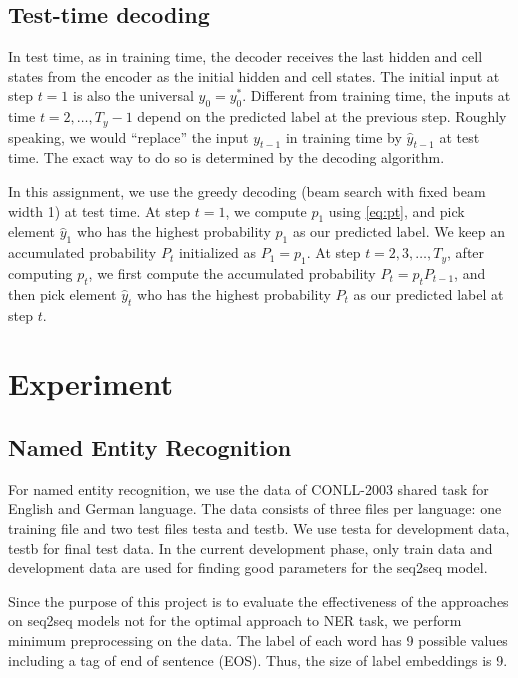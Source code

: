 \documentclass[11pt,a4paper]{article}
\begin{document}
\subsection{Test-time decoding}

In test time, as in training time, the decoder receives the last hidden and cell states from the encoder as the initial hidden and cell states. The initial input at step $t = 1$ is also the universal $y_0 = y_0^*$. Different from training time, the inputs at time $t = 2, \dots, T_y - 1$ depend on the predicted label at the previous step. Roughly speaking, we would ``replace'' the input $y_{t-1}$ in training time by $\hat{y}_{t-1}$ at test time. The exact way to do so is determined by the decoding algorithm.

In this assignment, we use the greedy decoding (beam search with fixed beam width 1) at test time. At step $t = 1$, we compute $p_1$ using \eqref{eq:pt}, and pick element $\hat{y}_1$ who has the highest probability $p_1$ as our predicted label. We keep an accumulated probability $P_t$ initialized as $P_1 = p_1$. At step $t = 2, 3, \dots, T_y$, after computing $p_t$, we first compute the accumulated probability $P_t = p_t P_{t-1}$, and then pick element $\hat{y}_t$ who has the highest probability $P_t$ as our predicted label at step $t$.



\section{Experiment}
\subsection{Named Entity Recognition} \label{ssec:ner}

For named entity recognition, we use the data of CONLL-2003 shared task \cite{tjongkimsang2003conll} for English and German language. The data consists of three files per language: one training file and two test files testa and testb. We use testa for development data, testb for final test data. In the current development phase, only train data and development data are used for finding good parameters for the seq2seq model. 

Since the purpose of this project is to evaluate the effectiveness of the approaches on seq2seq models not for the optimal approach to NER task, we perform minimum preprocessing on the data. The label of each word has 9 possible values including a tag of end of sentence (EOS). Thus, the size of label embeddings is 9. 
\end{document}
